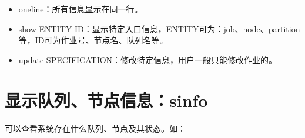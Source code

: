 \documentclass[a4paper,12pt,english]{sphinxmanual}
\begin{document}
\begin{itemize}
\begin{itemize}
\begin{itemize}
\item {} 
\sphinxAtStartPar
\sphinxhyphen{}\sphinxhyphen{}oneline：所有信息显示在同一行。

\item {} 
\sphinxAtStartPar
show ENTITY ID：显示特定入口信息，ENTITY可为：job、node、partition等，ID可为作业号、节点名、队列名等。

\item {} 
\sphinxAtStartPar
update SPECIFICATION：修改特定信息，用户一般只能修改作业的。

\end{itemize}

\end{itemize}

\end{itemize}


\section{显示队列、节点信息：sinfo}
\label{\detokenize{slurm/slurm:sinfo}}
\sphinxAtStartPar
{}可以查看系统存在什么队列、节点及其状态。如：
\end{document}
